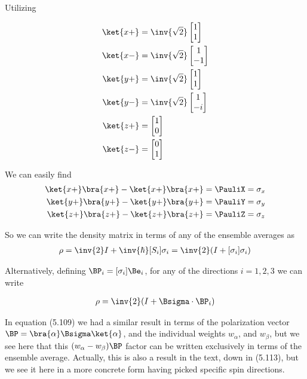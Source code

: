Utilizing 

\begin{align*}
\ket{x+} &= 
\inv{\sqrt{2}}
\begin{bmatrix}
1 \\
1
\end{bmatrix} \\
\ket{x-} &= 
\inv{\sqrt{2}}
\begin{bmatrix}
1 \\
-1
\end{bmatrix} \\
\ket{y+} &= 
\inv{\sqrt{2}}
\begin{bmatrix}
1 \\
1
\end{bmatrix} \\
\ket{y-} &= 
\inv{\sqrt{2}}
\begin{bmatrix}
1 \\
-i
\end{bmatrix} \\
\ket{z+} &= 
\begin{bmatrix}
1 \\
0
\end{bmatrix} \\
\ket{z-} &= 
\begin{bmatrix}
0 \\
1
\end{bmatrix}
\end{align*}

We can easily find
\begin{align*}
\ket{x+}\bra{x+} -\ket{x+}\bra{x+} &= \PauliX = \sigma_x \\
\ket{y+}\bra{y+} -\ket{y+}\bra{y+} &= \PauliY = \sigma_y \\
\ket{z+}\bra{z+} -\ket{z+}\bra{z+} &= \PauliZ = \sigma_z
\end{align*}

So we can write the density matrix in terms of any of the ensemble averages as
\begin{align*}
\rho =
\inv{2} I
+
\inv{\hbar} [S_i] \sigma_i
=
\inv{2} (I + [\sigma_i] \sigma_i )
\end{align*}

Alternatively, defining $\BP_i = [\sigma_i] \Be_i$, for any of the directions $i = 1,2,3$ we can write

\begin{align}\label{eqn:desaiCh5:503}
\rho = \inv{2} (I + \Bsigma \cdot \BP_i )
\end{align}

In equation (5.109) we had a similar result in terms of the polarization vector $\BP = \bra{\alpha} \Bsigma \ket{\alpha}$, and the individual weights $w_\alpha$, and $w_\beta$, but we see here that this $(w_\alpha - w_\beta)\BP$ factor can be written exclusively in terms of the ensemble average.  Actually, this is also a result in the text, down in (5.113), but we see it here in a more concrete form having picked specific spin directions.

